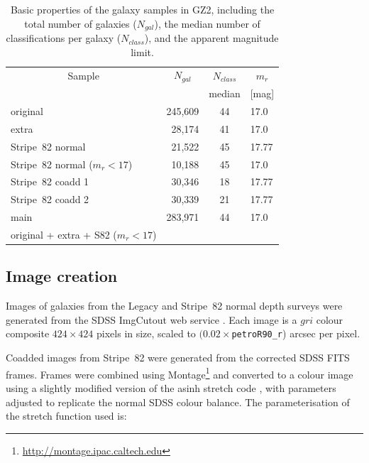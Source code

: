 \documentclass[useAMS,usenatbib]{mn2e}
\begin{document}
\begin{table}
 \begin{tabular}{@{}lrcl}
 \hline
\multicolumn{1}{c}{Sample} &
\multicolumn{1}{c}{$N_{gal}$} &
\multicolumn{1}{c}{$N_{class}$} &
\multicolumn{1}{c}{$m_r$} 
\\ 
\multicolumn{1}{c}{} &
\multicolumn{1}{c}{} &
\multicolumn{1}{c}{median} &
\multicolumn{1}{c}{[mag]} 
\\ 
\hline
\hline						
original                       & 245,609 & 44  & 17.0   \\     %
extra                          &  28,174 & 41  & 17.0   \\     %
Stripe~82 normal               &  21,522 & 45  & 17.77  \\     %
Stripe~82 normal ($m_r<17$)    &  10,188 & 45  & 17.0   \\     %
Stripe~82 coadd 1              &  30,346 & 18  & 17.77  \\     %
Stripe~82 coadd 2              &  30,339 & 21  & 17.77  \\     %
\hline
main                           & 283,971 & 44  & 17.0   \\     %
original + extra + S82 ($m_r<17$) & \\
\hline
 \end{tabular}
 \caption{Basic properties of the galaxy samples in GZ2, including the total number of galaxies ($N_{gal}$), the median number of classifications per galaxy ($N_{class}$), and the apparent magnitude limit. \label{tbl-sample}}
\end{table}

\subsection{Image creation}\label{ssec-imagecreation}

Images of galaxies from the Legacy and Stripe~82 normal depth surveys were generated from the SDSS ImgCutout web service \citep{nie04}. Each image is a $gri$ colour composite $424\times424$ pixels in size, scaled to $(0.02\times${\tt petroR90\_r}) arcsec per pixel.

Coadded images from Stripe~82 were generated from the corrected SDSS FITS frames. Frames were combined using Montage\footnote{\url{http://montage.ipac.caltech.edu}} and converted to a colour image using a slightly modified version of the asinh stretch code \citep{lup04}, with parameters adjusted to replicate the normal SDSS colour balance. The parameterisation of the stretch function used is:
\end{document}
